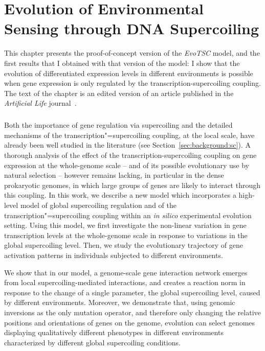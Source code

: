 \chapter{Evolution of Environmental Sensing through DNA Supercoiling}
\label{chap:alife}

This chapter presents the proof-of-concept version of the \emph{EvoTSC} model, and the first results that I obtained with that version of the model: I show that the evolution of differentiated expression levels in different environments is possible when gene expression is only regulated by the transcription-supercoiling coupling.
The text of the chapter is an edited version of an article published in the \emph{Artificial Life} journal~\citep{grohens2022a}.

\paragraph{}
Both the importance of gene regulation via supercoiling and the detailed mechanisms of the transcription"=supercoiling coupling, at the local scale, have already been well studied in the literature (see Section~\ref{sec:background:sc}). A thorough analysis of the  effect of the transcription-supercoiling coupling on gene expression at the whole-genome scale -- and of its possible evolutionary use by natural selection -- however remains lacking, in particular in the dense prokaryotic genomes, in which large groups of genes are likely to interact through this coupling.
In this work, we describe a new model which incorporates a high-level model of global supercoiling regulation and of the transcription"=supercoiling coupling within an \emph{in silico} experimental evolution setting.
Using this model, we first investigate the non-linear variation in gene transcription levels at the whole-genome scale in response to variations in the global supercoiling level.
Then, we study the evolutionary trajectory of gene activation patterns in individuals subjected to different environments.

We show that in our model, a genome-scale gene interaction network emerges from local supercoiling-mediated interactions, and creates a reaction norm in response to the change of a single parameter, the global supercoiling level, caused by different environments.
Moreover, we demonstrate that, using genomic inversions as the only mutation operator, and therefore only changing the relative positions and orientations of genes on the genome, evolution can select genomes displaying qualitatively different phenotypes in different environments characterized by different global supercoiling conditions.

